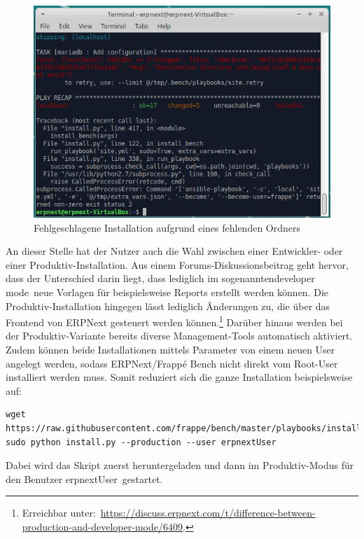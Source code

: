 \begin{figure}
  \centering
  \includegraphics[width=\textwidth]{Bilder/Fehlgeschlagene_Installation_2.PNG}
  \caption{Fehlgeschlagene Installation aufgrund eines fehlenden Ordners}
  \label{fig:fehlInst2}
\end{figure}
An dieser Stelle hat der Nutzer auch die Wahl zwischen einer Entwickler- oder einer Produktiv-Installation. Aus einem Forums-Diskussionsbeitrag geht hervor, dass der Unterschied darin liegt, dass lediglich im sogenannten\glqq developer mode\grqq\ neue Vorlagen für beispielsweise Reports erstellt werden können. Die Produktiv-Installation hingegen lässt lediglich Änderungen zu, die über das Frontend von ERPNext gesteuert werden können.\footnote{Erreichbar unter:\ \url{https://discuss.erpnext.com/t/difference-between-production-and-developer-mode/6409}.} Darüber hinaus werden bei der Produktiv-Variante bereits diverse Management-Tools automatisch aktiviert. \\
Zudem können beide Installationen mittels Parameter von einem neuen User angelegt werden, sodass ERPNext/Frappé Bench nicht direkt vom Root-User installiert werden muss.
Somit reduziert sich die ganze Installation beispielsweise auf:
  \begin{verbatim}
wget https://raw.githubusercontent.com/frappe/bench/master/playbooks/install.py
sudo python install.py --production --user erpnextUser
\end{verbatim}
Dabei wird das Skript zuerst heruntergeladen und dann im Produktiv-Modus für den Benutzer \glqq erpnextUser\grqq\ gestartet. \\
